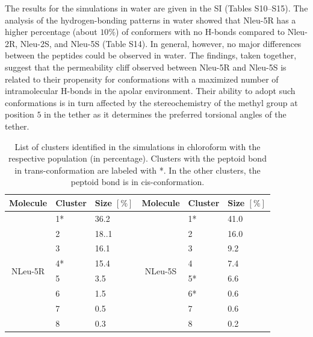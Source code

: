 The results for the simulations in water are given in the SI (Tables S10–S15). The analysis of the hydrogen-bonding patterns in water showed that Nleu-5R has a higher percentage (about $10\%$) of conformers with no H-bonds compared to Nleu-2R, Nleu-2S, and Nleu-5S (Table S14). In general, however, no major differences between the peptides could be observed in water.
The findings, taken together, suggest that the permeability cliff observed between Nleu-5R and Nleu-5S is related to their propensity for conformations with a maximized number of intramolecular H-bonds in the apolar environment. Their ability to adopt such conformations is in turn affected by the stereochemistry of the methyl group at position $5$ in the tether as it determines the preferred torsional angles of the tether.


\begin{table}[]
\center
\caption{List  of  clusters  identified  in  the  simulations  in  chloroform  with  the  respective 
population  (in  percentage).  Clusters  with  the  peptoid  bond  in  trans-conformation  are 
labeled with *. In the other clusters, the peptoid bond is in cis-conformation.}
\label{tab:SIClusterTransCHCL3}
\begin{tabular}{c|ll||c|ll}
Molecule                  & Cluster & Size $[\%]$ & Molecule                  & Cluster & Size $[\%]$ \\
\hline
\multirow{11}{*}{NLeu-5R} & 1*      & 36.2        & \multirow{11}{*}{NLeu-5S} & 1*      & 41.0        \\
                          & 2       & 18..1       &                           & 2       & 16.0        \\
                          & 3       & 16.1        &                           & 3       & 9.2         \\
                          & 4*      & 15.4        &                           & 4       & 7.4         \\
                          & 5       & 3.5         &                           & 5*      & 6.6         \\
                          & 6       & 1.5         &                           & 6*      & 0.6         \\
                          & 7       & 0.5         &                           & 7       & 0.6         \\
                          & 8       & 0.3         &                           & 8       & 0.2         \\

\end{tabular}
\end{table}
